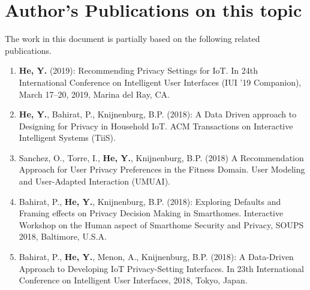 \chapter{Author's Publications on this topic}
\noindent The work in this document is partially based on the following related publications.
\begin{enumerate}
	\item \textbf{He, Y.} (2019): Recommending Privacy Settings for IoT. In 24th International Conference on Intelligent User Interfaces (IUI ’19 Companion), March 17--20, 2019, Marina del Ray, CA.
	
	\item \textbf{He, Y.}, Bahirat, P., Knijnenburg, B.P. (2018): A Data Driven approach to Designing for Privacy in Household IoT. ACM Transactions on Interactive Intelligent Systems (TiiS).
	
	\item Sanchez, O., Torre, I.,\textbf{ He, Y.}, Knijnenburg, B.P. (2018) A Recommendation Approach for User Privacy Preferences in the Fitness Domain. User Modeling and User-Adapted Interaction (UMUAI).
	
	\item Bahirat, P., \textbf{He, Y.}, Knijnenburg, B.P. (2018): Exploring Defaults and Framing effects on Privacy Decision Making in Smarthomes. Interactive Workshop on the Human aspect of Smarthome Security and Privacy, SOUPS 2018, Baltimore, U.S.A.
	\item Bahirat, P., \textbf{He, Y.}, Menon, A., Knijnenburg, B.P. (2018): A Data-Driven Approach to Developing IoT Privacy-Setting Interfaces. In 23th International Conference on Intelligent User Interfaces, 2018, Tokyo, Japan.
	
	
%	
\end{enumerate}